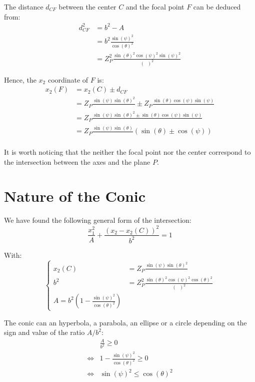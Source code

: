 \documentclass[a4paper,11pt,twoside,titlepage,openright]{book}
\numberwithin{equation}{section}
\newcommand{\lt}{\left}
\newcommand{\rt}{\right}
\DeclareMathOperator{\DD}{\cos(\theta)^2 - \sin(\psi)^2}
\begin{document}
The distance $d_{CF}$ between the center $C$ and the focal point $F$ can be deduced from:
$$
\begin{array}{lll}
	d_{CF}^2 & = b^2-A\\
		& = b^2\frac{\sin(\psi)^2}{\cos(\theta)^2}\\
		& = Z_P^2\frac{\sin(\theta)^2\cos(\psi)^2\sin(\psi)^2}{\lt(\DD\rt)^2}
\end{array}
$$

Hence, the $x_2$ coordinate of $F$ is:
$$
\begin{array}{lll}
	x_2(F) & = x_2(C) \pm d_{CF}\\
	       & = Z_P\frac{\sin(\psi)\sin(\theta)^2}{\DD} \pm Z_P\frac{\sin(\theta)\cos(\psi)\sin(\psi)}{\DD}\\
	       & = Z_P\frac{\sin(\psi)\sin(\theta)^2 \pm \sin(\theta)\cos(\psi)\sin(\psi)}{\DD}\\
	       & = Z_P\frac{\sin(\psi)\sin(\theta)}{\DD}\lt(\sin(\theta) \pm \cos(\psi)\rt)\\
\end{array}
$$

It is worth noticing that the neither the focal point nor the center correspond to the intersection between the axes and the plane $P$.


\section{Nature of the Conic}

We have found the following general form of the intersection:
$$
\frac{x_1^2}{ A } + \frac{\lt(x_2-x_2(C)\rt)^2}{b^2} = 1
$$


With:
$$
\lt\{
	\begin{array}{lll}
		x_2(C) & = Z_P\frac{\sin(\psi)\sin(\theta)^2}{\DD}\\
		b^2 & = Z_P^2\frac{\sin(\theta)^2\cos(\psi)^2\cos(\theta)^2}{\lt(\DD\rt)^2}\\
		A = b^2\lt(1-\frac{\sin(\psi)^2}{\cos(\theta)^2}\rt)
	\end{array}
\rt.
$$

The conic can an hyperbola, a parabola, an ellipse or a circle depending on the
sign and value of the ratio $A/b^2$:
$$
\begin{array}{lll}
    & \frac{A}{b^2} \geq 0\\
    \Leftrightarrow & 1-\frac{\sin(\psi)^2}{\cos(\theta)^2} \geq 0\\
    \Leftrightarrow & \sin(\psi)^2 \leq \cos(\theta)^2\\
\end{array}
$$
\end{document}
